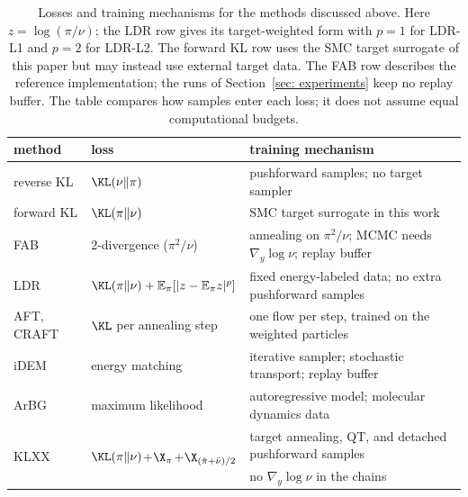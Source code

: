 \documentclass{article}
\begin{document}
\begin{table}[htb]
\centering
{\small
\begin{tabular}{@{}lll@{}}
\toprule
method & loss & training mechanism \\
\midrule
reverse KL & $\KL(\nu\|\pi)$ & pushforward samples; no target sampler \\
forward KL & $\KL(\pi\|\nu)$ & SMC target surrogate in this work \\
FAB & $2$-divergence ($\pi^2/\nu$) & annealing on $\pi^2/\nu$; MCMC needs $\nabla_y\log\nu$; replay buffer \\
LDR & $\KL(\pi\|\nu)+\mathbb E_\pi[|z-\mathbb E_\pi z|^p]$ & fixed energy-labeled data; no extra pushforward samples \\
AFT, CRAFT & $\KL$ per annealing step & one flow per step, trained on the weighted particles \\
iDEM & energy matching & iterative sampler; stochastic transport; replay buffer \\
ArBG & maximum likelihood & autoregressive model; molecular dynamics data \\
\multirow{2}{*}{KLXX} &
\multirow{2}{*}{$\KL(\pi\|\nu)$+$\X_\pi$+$\X_{(\hat\pi+\bar\nu)/2}$} &
target annealing, QT, and detached pushforward samples \\
& & no $\nabla_y\log\nu$ in the chains \\
\bottomrule
\end{tabular}
}
\caption{Losses and training mechanisms for the methods discussed above. Here $z=\log(\pi/\nu)$; the LDR row gives its target-weighted form with $p=1$ for LDR-L1 and $p=2$ for LDR-L2. The forward KL row uses the SMC target surrogate of this paper but may instead use external target data. The FAB row describes the reference implementation; the runs of Section~\ref{sec: experiments} keep no replay buffer. The table compares how samples enter each loss; it does not assume equal computational budgets.}
\label{tab: loss-methods}
\end{table}
\end{document}
